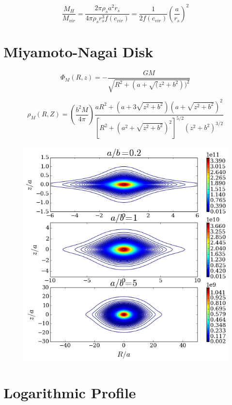\documentclass[a4paper, 12pt]{article} %
\begin{document}
\begin{equation}
\dfrac{M_H}{M_{vir}} = \dfrac{2 \pi \rho_s a^2 r_s}{4 \pi \rho_s r_s^3 f(c_{vir})} = \dfrac{1}{2 f(c_{vir})}  \left( \dfrac{a}{r_s}\right)^2
\end{equation}

\section{Miyamoto-Nagai Disk}

\begin{equation}
\Phi_M (R, z) = - \dfrac{GM}{\sqrt{R^2 + (a + \sqrt(z^2 + b^2))^2}}
\end{equation}

\begin{equation}
\rho_M (R, Z) = \left( \dfrac{b^2 M}{4 \pi} \right) \dfrac{aR^2 + (a + 3\sqrt{z^2+b^2})(a + \sqrt{z^2+b^2})^2}{[R^2 + (a^2 + \sqrt{z^2+b^2})^2]^{5/2}(z^2+b^2)^{3/2} }
\end{equation}


\begin{figure}[H]\label{fig:MN_density}
\centering
\includegraphics[scale=0.7]{MN_density_contours.png}
\end{figure}

\section{Logarithmic Profile}\label{sec:log}
\end{document}
